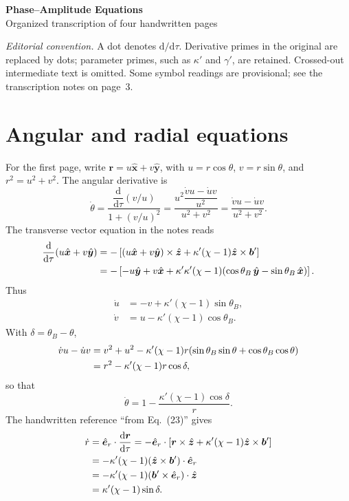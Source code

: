 \documentclass[11pt,a4paper]{article}
\newcommand{\dd}{\mathrm{d}}
\newcommand{\er}{\hat{\bm e}_r}
\newcommand{\ez}{\hat{\bm z}}
\newcommand{\ex}{\hat{\bm x}}
\newcommand{\ey}{\hat{\bm y}}
\begin{document}
\begin{center}
{\LARGE\bfseries Phase--Amplitude Equations}\\[5pt]
{\large Organized transcription of four handwritten pages}
\end{center}

\textit{Editorial convention.} A dot denotes $\dd/\dd\tau$. Derivative
primes in the original are replaced by dots; parameter primes, such as $\kappa'$
and $\gamma'$, are retained. Crossed-out intermediate text is omitted.
Some symbol readings are provisional; see the transcription notes on page~3.

\section{Angular and radial equations}
For the first page, write $\bm r=u\ex+v\ey$, with
$u=r\cos\theta$, $v=r\sin\theta$, and $r^2=u^2+v^2$.
The angular derivative is
\begin{equation}
\dot\theta
=\frac{\dfrac{\dd}{\dd\tau}(v/u)}{1+(v/u)^2}
=\frac{u^2\dfrac{\dot v u-\dot u v}{u^2}}{u^2+v^2}
=\frac{\dot v u-\dot u v}{u^2+v^2}.
\end{equation}
The transverse vector equation in the notes reads
\begin{align}
\frac{\dd}{\dd\tau}(u\ex+v\ey)
&=-\left[(u\ex+v\ey)\times\ez
+\kappa'(\chi-1)\ez\times\bm b'\right] \notag\\
&=-\left[-u\ey+v\ex
+\kappa'\kappa'(\chi-1)(\cos\theta_B\,\ey-\sin\theta_B\,\ex)\right].
\end{align}
Thus
\begin{equation}
\boxed{\begin{aligned}
\dot u&=-v+\kappa'(\chi-1)\sin\theta_B,\\
\dot v&=u-\kappa'(\chi-1)\cos\theta_B.
\end{aligned}}
\end{equation}
With $\delta=\theta_B-\theta$,
\begin{align}
\dot v u-\dot u v
&=v^2+u^2-\kappa'(\chi-1)r
 (\sin\theta_B\sin\theta+\cos\theta_B\cos\theta)\notag\\
&=r^2-\kappa'(\chi-1)r\cos\delta,
\end{align}
so that
\begin{equation}
\boxed{\dot\theta=1-\frac{\kappa'(\chi-1)\cos\delta}{r}.}
\end{equation}
The handwritten reference ``from Eq.~(23)'' gives
\begin{align}
\dot r
&=\er\cdot\frac{\dd\bm r}{\dd\tau}
=-\er\cdot\left[\bm r\times\ez
+\kappa'(\chi-1)\ez\times\bm b'\right]\notag\\
&=-\kappa'(\chi-1)(\ez\times\bm b')\cdot\er\notag\\
&=-\kappa'(\chi-1)(\bm b'\times\er)\cdot\ez\notag\\
&=\kappa'(\chi-1)\sin\delta.
\end{align}
\end{document}

